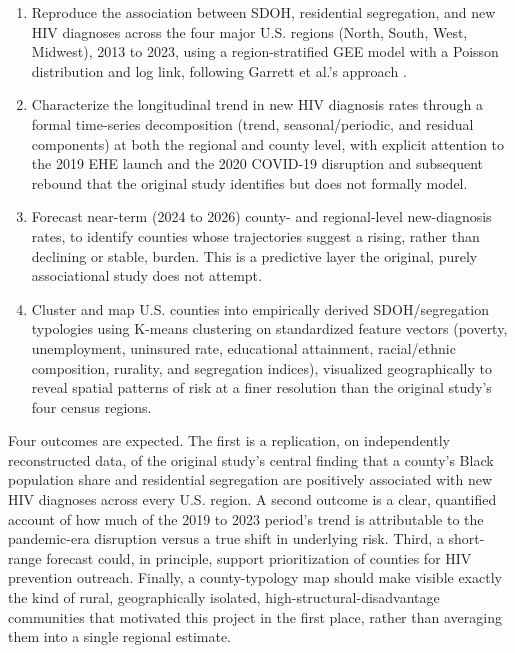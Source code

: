 \documentclass[11pt,letterpaper]{article}
\begin{document}
\begin{enumerate}[leftmargin=1.4em]
  \item Reproduce the association between SDOH, residential segregation, and new HIV diagnoses across the four major U.S. regions (North, South, West, Midwest), 2013 to 2023, using a region-stratified GEE model with a Poisson distribution and log link, following Garrett et al.'s approach \cite{garrett2026}.
  \item Characterize the longitudinal trend in new HIV diagnosis rates through a formal time-series decomposition (trend, seasonal/periodic, and residual components) at both the regional and county level, with explicit attention to the 2019 EHE launch and the 2020 COVID-19 disruption and subsequent rebound that the original study identifies but does not formally model.
  \item Forecast near-term (2024 to 2026) county- and regional-level new-diagnosis rates, to identify counties whose trajectories suggest a rising, rather than declining or stable, burden. This is a predictive layer the original, purely associational study does not attempt.
  \item Cluster and map U.S. counties into empirically derived SDOH/segregation typologies using K-means clustering on standardized feature vectors (poverty, unemployment, uninsured rate, educational attainment, racial/ethnic composition, rurality, and segregation indices), visualized geographically to reveal spatial patterns of risk at a finer resolution than the original study's four census regions.
\end{enumerate}

\noindent Four outcomes are expected. The first is a replication, on independently reconstructed data, of the original study's central finding that a county's Black population share and residential segregation are positively associated with new HIV diagnoses across every U.S. region. A second outcome is a clear, quantified account of how much of the 2019 to 2023 period's trend is attributable to the pandemic-era disruption versus a true shift in underlying risk. Third, a short-range forecast could, in principle, support prioritization of counties for HIV prevention outreach. Finally, a county-typology map should make visible exactly the kind of rural, geographically isolated, high-structural-disadvantage communities that motivated this project in the first place, rather than averaging them into a single regional estimate.

\end{document}

